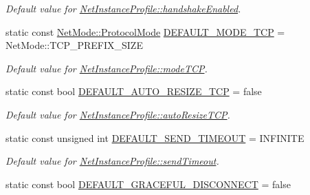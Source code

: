 \begin{DoxyCompactItemize}
\begin{DoxyCompactList}\small\item\em Default value for \hyperlink{class_net_instance_profile_aaeba0fb41f3972711b0d789d13d74c0f}{NetInstanceProfile::handshakeEnabled}. \item\end{DoxyCompactList}\item 
\hypertarget{class_net_instance_profile_ad1d027ea1d01003564961be529fd5766}{
static const \hyperlink{class_net_mode_a43cfa55ee6a4db66a8d7d6c27f766964}{NetMode::ProtocolMode} \hyperlink{class_net_instance_profile_ad1d027ea1d01003564961be529fd5766}{DEFAULT\_\-MODE\_\-TCP} = NetMode::TCP\_\-PREFIX\_\-SIZE}
\label{class_net_instance_profile_ad1d027ea1d01003564961be529fd5766}

\begin{DoxyCompactList}\small\item\em Default value for \hyperlink{class_net_instance_profile_acfc65e0440c83e5e5fa35f3480d8db3e}{NetInstanceProfile::modeTCP}. \item\end{DoxyCompactList}\item 
\hypertarget{class_net_instance_profile_ae0797a8d2fdfb3f67a7b67a103a99fcb}{
static const bool \hyperlink{class_net_instance_profile_ae0797a8d2fdfb3f67a7b67a103a99fcb}{DEFAULT\_\-AUTO\_\-RESIZE\_\-TCP} = false}
\label{class_net_instance_profile_ae0797a8d2fdfb3f67a7b67a103a99fcb}

\begin{DoxyCompactList}\small\item\em Default value for \hyperlink{class_net_instance_profile_a9c10389be76ce558cdaad5e5847d7d96}{NetInstanceProfile::autoResizeTCP}. \item\end{DoxyCompactList}\item 
\hypertarget{class_net_instance_profile_a7a3abeb53ed94ac5a75c408f2684e909}{
static const unsigned int \hyperlink{class_net_instance_profile_a7a3abeb53ed94ac5a75c408f2684e909}{DEFAULT\_\-SEND\_\-TIMEOUT} = INFINITE}
\label{class_net_instance_profile_a7a3abeb53ed94ac5a75c408f2684e909}

\begin{DoxyCompactList}\small\item\em Default value for \hyperlink{class_net_instance_profile_a6cc36534bcb31e4411e2698e55908c18}{NetInstanceProfile::sendTimeout}. \item\end{DoxyCompactList}\item 
\hypertarget{class_net_instance_profile_ada7dfa96aa2fd6c205dc1137f2aad30d}{
static const bool \hyperlink{class_net_instance_profile_ada7dfa96aa2fd6c205dc1137f2aad30d}{DEFAULT\_\-GRACEFUL\_\-DISCONNECT} = false}
\label{class_net_instance_profile_ada7dfa96aa2fd6c205dc1137f2aad30d}


\end{DoxyCompactItemize}
